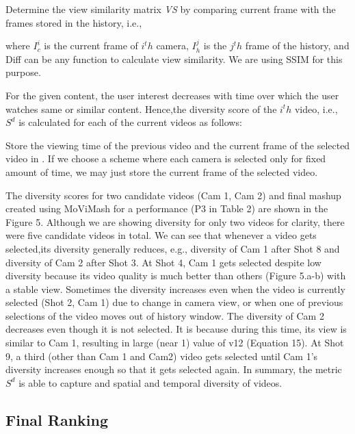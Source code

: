 \documentclass{sig-alternate}
\begin{document}
\begin{enumerize}
    \item Determine the view similarity matrix \textit{VS} by comparing current frame with the frames stored in the history, i.e.,
    
    where $I_c^i$ is the current frame of $i^th$ camera, $I_h^j$ is the $j^th$ frame of the history, and Diff can be any function to calculate view similarity. We are using SSIM \cite{17} for this purpose.
    
    \item For the given content, the user interest decreases with time over which the user watches same or similar content. Hence,the diversity score of the $i^th$ video, i.e., $S^d$ is calculated for each of the current videos as follows:
    
    \item Store the viewing time of the previous video and the current frame of the selected video in . If we choose a scheme where each camera is selected only for fixed amount of time, we may just store the current frame of the selected video.
    
    

\end{enumerize}

The diversity scores for two candidate videos (Cam 1, Cam 2) and final mashup created using MoViMash for a performance (P3 in Table 2) are shown in the Figure 5. Although we are showing diversity for only two videos for clarity, there were five candidate videos in total. We can see that whenever a video gets selected,its diversity generally reduces, e.g., diversity of Cam 1 after Shot 8 and diversity of Cam 2 after Shot 3. At Shot 4, Cam 1 gets selected despite low diversity because its video quality is much better than others (Figure 5.a-b) with a stable view. Sometimes the diversity increases even when the video is currently selected (Shot 2, Cam 1) due to change in camera view, or when one of previous selections of the video moves out of history window. The diversity of Cam 2 decreases even though it is not selected. It is because during this time, its view is similar to Cam 1, resulting in large (near 1) value of v12 (Equation 15). At Shot 9, a third (other than Cam 1 and Cam2) video gets selected until Cam 1’s diversity increases enough so that it gets selected again. In summary, the metric $S^d$ is able to capture and spatial and temporal diversity of videos.

\subsection{Final Ranking}
\end{document}
